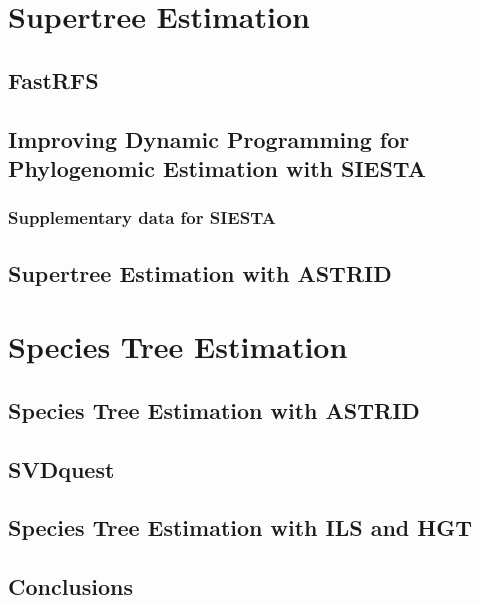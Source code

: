 \documentclass[edeposit,fullpage]{uiucthesis2014}
\theoremstyle{definition}
\begin{document}
\part{Supertree Estimation}
\label{part:supertree}

\chapter{FastRFS}
\label{chapter:fastrfs}


\chapter{Improving Dynamic Programming for Phylogenomic Estimation
  with SIESTA}
\label{chapter:siesta}

\section{Supplementary data for SIESTA}


\chapter{Supertree Estimation with ASTRID}
\label{chapter:astrid-missing}





\part{Species Tree Estimation}
\label{part:speciestree}

\chapter{Species Tree Estimation with ASTRID}
\label{chapter:astrid}



\chapter{SVDquest}
\label{chapter:svdquest}


\chapter{Species Tree Estimation with ILS and HGT}
\label{chapter:hgt}



\chapter{Conclusions}

\printbibliography

\backmatter
\end{document}
